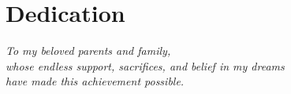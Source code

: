 \chapter*{Dedication}
\begin{center}
    \vspace*{4cm}
    \itshape
    To my beloved parents and family,\\
    whose endless support, sacrifices, and belief in my dreams\\
    have made this achievement possible.
\end{center}
